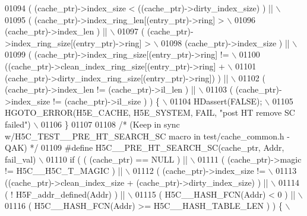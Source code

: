 \begin{DoxyCode}
01094 \textcolor{preprocessor}{     ( (cache\_ptr)->index\_size < ((cache\_ptr)->dirty\_index\_size) ) ||    \(\backslash\)}
01095 \textcolor{preprocessor}{     ( (cache\_ptr)->index\_ring\_len[(entry\_ptr)->ring] >                  \(\backslash\)}
01096 \textcolor{preprocessor}{       (cache\_ptr)->index\_len ) ||                                       \(\backslash\)}
01097 \textcolor{preprocessor}{     ( (cache\_ptr)->index\_ring\_size[(entry\_ptr)->ring] >                 \(\backslash\)}
01098 \textcolor{preprocessor}{       (cache\_ptr)->index\_size ) ||                                      \(\backslash\)}
01099 \textcolor{preprocessor}{     ( (cache\_ptr)->index\_ring\_size[(entry\_ptr)->ring] !=                \(\backslash\)}
01100 \textcolor{preprocessor}{       ((cache\_ptr)->clean\_index\_ring\_size[(entry\_ptr)->ring] +          \(\backslash\)}
01101 \textcolor{preprocessor}{        (cache\_ptr)->dirty\_index\_ring\_size[(entry\_ptr)->ring]) ) ||      \(\backslash\)}
01102 \textcolor{preprocessor}{     ( (cache\_ptr)->index\_len != (cache\_ptr)->il\_len ) ||                \(\backslash\)}
01103 \textcolor{preprocessor}{     ( (cache\_ptr)->index\_size != (cache\_ptr)->il\_size ) ) \{             \(\backslash\)}
01104 \textcolor{preprocessor}{    HDassert(FALSE);                                                     \(\backslash\)}
01105 \textcolor{preprocessor}{    HGOTO\_ERROR(H5E\_CACHE, H5E\_SYSTEM, FAIL, "post HT remove SC failed") \(\backslash\)}
01106 \textcolor{preprocessor}{\}}
01107 
01108 \textcolor{comment}{/* (Keep in sync w/H5C\_TEST\_\_PRE\_HT\_SEARCH\_SC macro in test/cache\_common.h -QAK) */}
01109 \textcolor{preprocessor}{#define H5C\_\_PRE\_HT\_SEARCH\_SC(cache\_ptr, Addr, fail\_val)                    \(\backslash\)}
01110 \textcolor{preprocessor}{if ( ( (cache\_ptr) == NULL ) ||                                             \(\backslash\)}
01111 \textcolor{preprocessor}{     ( (cache\_ptr)->magic != H5C\_\_H5C\_T\_MAGIC ) ||                          \(\backslash\)}
01112 \textcolor{preprocessor}{     ( (cache\_ptr)->index\_size !=                                           \(\backslash\)}
01113 \textcolor{preprocessor}{       ((cache\_ptr)->clean\_index\_size + (cache\_ptr)->dirty\_index\_size) ) || \(\backslash\)}
01114 \textcolor{preprocessor}{     ( ! H5F\_addr\_defined(Addr) ) ||                                        \(\backslash\)}
01115 \textcolor{preprocessor}{     ( H5C\_\_HASH\_FCN(Addr) < 0 ) ||                                         \(\backslash\)}
01116 \textcolor{preprocessor}{     ( H5C\_\_HASH\_FCN(Addr) >= H5C\_\_HASH\_TABLE\_LEN ) ) \{                     \(\backslash\)}

\end{DoxyCode}
